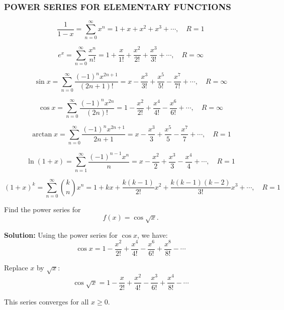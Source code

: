 \documentclass[12pt]{article}
\theoremstyle{beautifulthm}
\begin{document}
\subsubsection{POWER SERIES FOR ELEMENTARY FUNCTIONS}

\begin{tcolorbox}[colframe=blue!75!black, colback=white, title=Power Series Representations]
\[
\frac{1}{1-x} = \sum_{n=0}^\infty x^n = 1 + x + x^2 + x^3 + \cdots, \quad R = 1
\]

\[
e^x = \sum_{n=0}^\infty \frac{x^n}{n!} = 1 + \frac{x}{1!} + \frac{x^2}{2!} + \frac{x^3}{3!} + \cdots, \quad R = \infty
\]

\[
\sin x = \sum_{n=0}^\infty \frac{(-1)^n x^{2n+1}}{(2n+1)!} = x - \frac{x^3}{3!} + \frac{x^5}{5!} - \frac{x^7}{7!} + \cdots, \quad R = \infty
\]

\[
\cos x = \sum_{n=0}^\infty \frac{(-1)^n x^{2n}}{(2n)!} = 1 - \frac{x^2}{2!} + \frac{x^4}{4!} - \frac{x^6}{6!} + \cdots, \quad R = \infty
\]

\[
\arctan x = \sum_{n=0}^\infty \frac{(-1)^n x^{2n+1}}{2n+1} = x - \frac{x^3}{3} + \frac{x^5}{5} - \frac{x^7}{7} + \cdots, \quad R = 1
\]

\[
\ln(1+x) = \sum_{n=1}^\infty \frac{(-1)^{n-1} x^n}{n} = x - \frac{x^2}{2} + \frac{x^3}{3} - \frac{x^4}{4} + \cdots, \quad R = 1
\]

\[
(1+x)^k = \sum_{n=0}^\infty \binom{k}{n} x^n = 1 + kx + \frac{k(k-1)}{2!}x^2 + \frac{k(k-1)(k-2)}{3!}x^3 + \cdots, \quad R = 1
\]
\end{tcolorbox}



\begin{tcolorbox}[colback=examplebg, colframe=red!75!black, title=\textbf{EXAMPLE 5: Deriving a Power Series from a Basic List}, fonttitle=\bfseries, sharp corners]

Find the power series for 
\[
f(x) = \cos \sqrt{x}.
\]

\tcblower
\textbf{Solution:} 
Using the power series for $\cos x$, we have:
\[
\cos x = 1 - \frac{x^2}{2!} + \frac{x^4}{4!} - \frac{x^6}{6!} + \frac{x^8}{8!} - \cdots
\]

Replace $x$ by $\sqrt{x}$:
\[
\cos \sqrt{x} = 1 - \frac{x}{2!} + \frac{x^2}{4!} - \frac{x^3}{6!} + \frac{x^4}{8!} - \cdots
\]

This series converges for all $x \geq 0$.
\end{tcolorbox}
\end{document}
